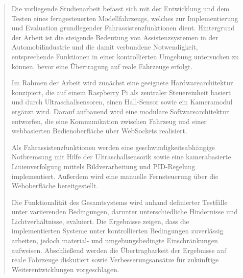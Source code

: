 
\pagestyle{empty}

\renewcommand{\abstractname}{Zusammenfassung}
\begin{abstract}
    Die vorliegende Studienarbeit befasst sich mit der Entwicklung und dem Testen eines ferngesteuerten Modellfahrzeugs, welches zur Implementierung und Evaluation grundlegender Fahrassistenzfunktionen dient. Hintergrund der Arbeit ist die steigende Bedeutung von Assistenzsystemen in der Automobilindustrie und die damit verbundene Notwendigkeit, entsprechende Funktionen in einer kontrollierten Umgebung untersuchen zu können, bevor eine Übertragung auf reale Fahrzeuge erfolgt.

    Im Rahmen der Arbeit wird zunächst eine geeignete Hardwarearchitektur konzipiert, die auf einem Raspberry Pi als zentraler Steuereinheit basiert und durch Ultraschallsensoren, einen Hall-Sensor sowie ein Kameramodul ergänzt wird. Darauf aufbauend wird eine modulare Softwarearchitektur entworfen, die eine Kommunikation zwischen Fahrzeug und einer webbasierten Bedienoberfläche über WebSockets realisiert.

    Als Fahrassistenzfunktionen werden eine geschwindigkeitsabhängige Notbremsung mit Hilfe der Ultraschallsensorik sowie eine kamerabasierte Linienverfolgung mittels Bildverarbeitung und PID-Regelung implementiert. Außerdem wird eine manuelle Fernsteuerung über die Weboberfläche bereitgestellt.

    Die Funktionalität des Gesamtsystems wird anhand definierter Testfälle unter variierenden Bedingungen, darunter unterschiedliche Hindernisse und Lichtverhältnisse, evaluiert. Die Ergebnisse zeigen, dass die implementierten Systeme unter kontrollierten Bedingungen zuverlässig arbeiten, jedoch material- und umgebungsbedingte Einschränkungen aufweisen. Abschließend werden die Übertragbarkeit der Ergebnisse auf reale Fahrzeuge diskutiert sowie Verbesserungsansätze für zukünftige Weiterentwicklungen vorgeschlagen.
\end{abstract}


